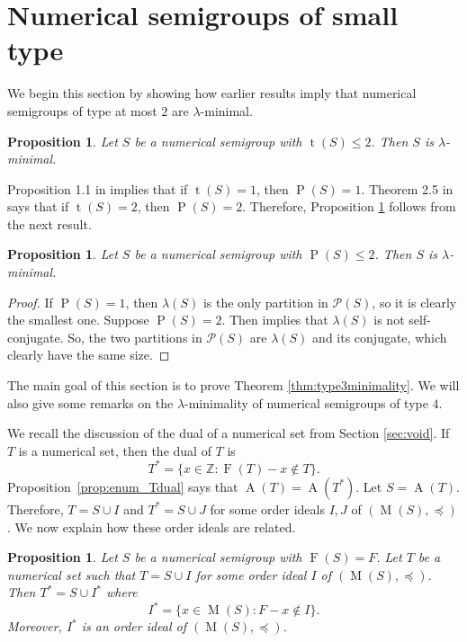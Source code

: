 \documentclass{amsproc}
\newcommand{\Z}{\mathbb{Z}}
\DeclareMathOperator{\F}{F}
\DeclareMathOperator{\Pa}{P}
\DeclareMathOperator{\type}{t}
\DeclareMathOperator{\A}{A}
\DeclareMathOperator{\M}{M}
\newtheorem{prop}[theorem]{Proposition}
\theoremstyle{definition}
\theoremstyle{remark}
\numberwithin{equation}{section}
\begin{document}
\section{Numerical semigroups of small type}\label{sec:small_type}

We begin this section by showing how earlier results imply that numerical semigroups of type at most $2$ are $\lambda$-minimal.
\begin{prop}\label{prop:type_less2}
Let $S$ be a numerical semigroup with $\type(S) \le 2$.  Then $S$ is $\lambda$-minimal.
\end{prop}
Proposition 1.1 in \cite{MarzuolaMiller} implies that if $\type(S) =1$, then $\Pa(S) =1$.  Theorem 2.5 in \cite{chen2023enumeratingnumericalsetsassociated} says that if $\type(S) = 2$, then $\Pa(S) =2$.  Therefore, Proposition \ref{prop:type_less2} follows from the next result.  
\begin{prop}\label{prop:PS2_lam_min}
Let $S$ be a numerical semigroup with $\Pa(S) \le 2$.  Then $S$ is $\lambda$-minimal.
\end{prop}
\begin{proof}
If $\Pa(S) =1$, then $\lambda(S)$ is the only partition in $\mathcal{P}(S)$, so it is clearly the smallest one.  Suppose $\Pa(S) = 2$.  Then \cite[Proposition 11]{CONSTANTIN201799} implies that $\lambda(S)$ is not self-conjugate. So, the two partitions in $\mathcal{P}(S)$ are $\lambda(S)$ and its conjugate, which clearly have the same size.
\end{proof}


The main goal of this section is to prove Theorem \ref{thm:type3minimality}.  We will also give some remarks on the $\lambda$-minimality of numerical semigroups of type $4$.


We recall the discussion of the dual of a numerical set from Section \ref{sec:void}. If $T$ is a numerical set, then the dual of $T$ is 
\[
T^* = \{x\in \Z \colon \F(T) - x\not\in T\}.
\]
Proposition~\ref{prop:enum_Tdual} says that $\A(T) = \A(T^*)$. Let $S=\A(T)$. Therefore, $T = S \cup I$ and $T^* = S \cup J$ for some order ideals $I, J$ of $(\M(S),\preccurlyeq)$.  We now explain how these order ideals are related.
 

\begin{prop}\label{prop:dual_ideal}
    Let $S$ be a numerical semigroup with $\F(S) = F$. Let $T$ be a numerical set such that $T = S\cup I$ for some order ideal $I$ of $(\M(S),\preccurlyeq)$. Then $T^* = S\cup I^*$ where 
    \[
    I^* = \{x \in \M(S) \colon F - x \notin I\}.
    \]
    Moreover, $I^*$ is an order ideal of $(\M(S),\preccurlyeq)$.
\end{prop}
\end{document}
